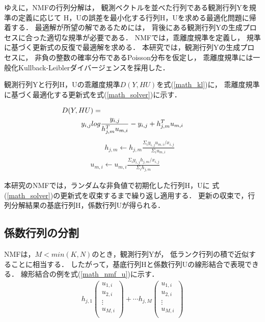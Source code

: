 \documentclass[12pt,a4paper,twocolumn,twoside]{jsik}
\begin{document}
ゆえに，NMFの行列分解は，
観測ベクトルを並べた行列である観測行列Yを規準の定義に応じて
H，Uの誤差を最小化する行列H，Uを求める最適化問題に帰着する．
%
最適解が所望の解であるためには，
背後にある観測行列Yの生成プロセスに合った適切な規準が必要である．
%
NMFでは，乖離度規準を定義し，
規準に基づく更新式の反復で最適解を求める\cite{nmf}．
%
本研究では，観測行列Yの生成プロセスに，
非負の整数の確率分布であるPoisson分布を仮定し，
乖離度規準には一般化Kullback-Leiblerダイバージェンス\cite{nmf}を採用した．

\newpage
観測行列Yと行列H，Uの乖離度規準$D(Y,HU)$を式(\ref{math_kl})に，
乖離度規準に基づく最適化する更新式を式(\ref{math_solver})に示す．

\begin{eqnarray}
\label{math_kl}
\lefteqn{\hspace{-60mm}D(Y,HU)=}\nonumber\\
y_{i,j} log \frac{y_{i,j}}{h_{j,m}^{T}u_{m,i}} - y_{i,j} + h_{j,m}^{T}u_{m,i}
\end{eqnarray}
%
\begin{eqnarray}
\label{math_solver}
\qquad h_{j,m} \leftarrow h_{j,m} \frac{\Sigma_{i}y_{i,j}u_{m,i}/x_{i,j}}{ \Sigma_{i}u_{m,i}}\nonumber\\
u_{m,i} \leftarrow u_{m,i} \frac{\Sigma_{i}y_{i,j}h_{j,m}/x_{i,j}}{ \Sigma_{i}h_{j,m}} 
\end{eqnarray}

本研究のNMFでは，ランダムな非負値で初期化した行列H，Uに
式(\ref{math_solver})の更新式を収束するまで繰り返し適用する\cite{nmf}．
更新の収束で，行列分解結果の基底行列H，係数行列Uが得られる．

\subsection{係数行列の分割}\label{SPLIT}
NMFは，$M<min(K,N)$のとき，観測行列Yが，
低ランク行列の積で近似することに相当する．
したがって，基底行列Hと係数行列Uの線形結合で表現できる．
%
線形結合の例を式(\ref{math_nmf_u})に示す．
%
\\
\begin{eqnarray}
\label{math_nmf_u}
h_{j,1}
\left(
\begin{array}{c}
u_{1,i} \\
u_{2,i} \\
 \vdots \\
u_{M,i} \\
\end{array}
\right)
+
\cdots 
h_{j,M}
\left(
\begin{array}{c}
u_{1,i} \\
u_{2,i} \\
 \vdots \\
u_{M,i} \\
\end{array}
\right)
\end{eqnarray}
\end{document}
